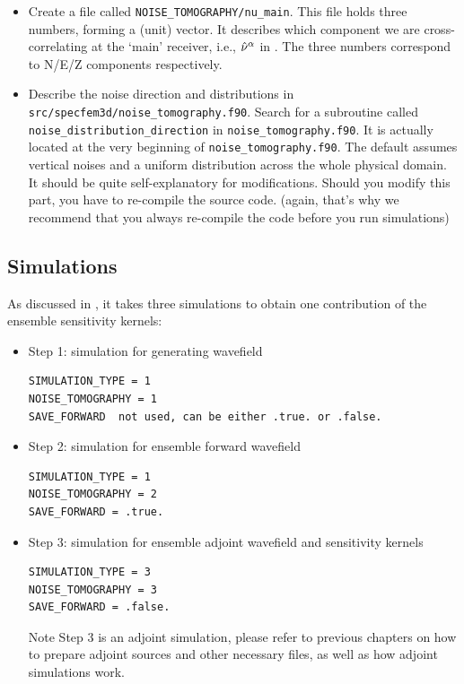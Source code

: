 \begin{itemize}
Note that in regional (1- or 2-chunk) simulations, the \texttt{DATA/STATIONS}
may contain receivers not within the selected chunk(s).
Therefore, the integer in \texttt{NOISE\_TOMOGRAPHY/irec\_main\_noise}
is actually the ID in \texttt{DATA/STATIONS\_FILTERED} (which is generated by \texttt{xspecfem3D}).

\item
Create a file called \texttt{NOISE\_TOMOGRAPHY/nu\_main}. This file holds three numbers,
forming a (unit) vector. It describes which component we are cross-correlating at the `main'
receiver, i.e., ${\hat{\bf \nu}}^{\alpha}$ in \citet{trompetal2010}. The three numbers correspond to
N/E/Z components respectively.

\item
Describe the noise direction and distributions in \texttt{src/specfem3d/noise\_tomography.f90}.
Search for a subroutine called \texttt{noise\_distribution\_direction}
in \texttt{noise\_tomography.f90}. It is actually located at the very beginning
of \texttt{noise\_tomography.f90}. The default assumes vertical noises and a uniform distribution
across the whole physical domain. It should be quite self-explanatory for modifications.
Should you modify this part, you have to re-compile the source code. (again, that's why we recommend
that you always re-compile the code before you run simulations)

\end{itemize}

\subsection{Simulations}

As discussed in \citet{trompetal2010}, it takes three simulations to obtain one contribution
of the ensemble sensitivity kernels:

\begin{itemize}
\item
Step 1: simulation for generating wavefield
\begin{verbatim}
SIMULATION_TYPE = 1
NOISE_TOMOGRAPHY = 1
SAVE_FORWARD  not used, can be either .true. or .false.
\end{verbatim}

\item
Step 2: simulation for ensemble forward wavefield
\begin{verbatim}
SIMULATION_TYPE = 1
NOISE_TOMOGRAPHY = 2
SAVE_FORWARD = .true.
\end{verbatim}

\item
Step 3: simulation for ensemble adjoint wavefield and sensitivity kernels
\begin{verbatim}
SIMULATION_TYPE = 3
NOISE_TOMOGRAPHY = 3
SAVE_FORWARD = .false.
\end{verbatim}

Note Step 3 is an adjoint simulation, please refer to previous chapters on how to prepare adjoint sources
and other necessary files, as well as how adjoint simulations work.

\end{itemize}

